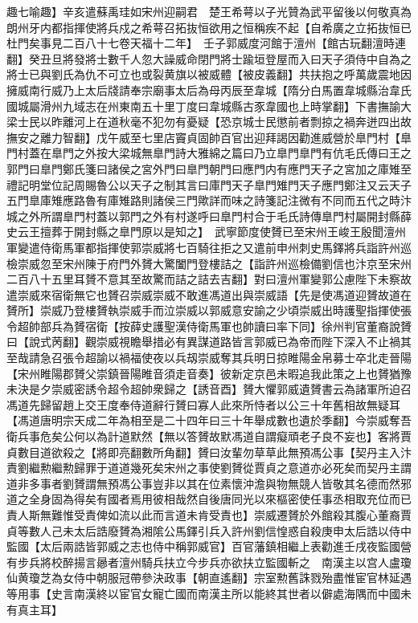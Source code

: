 趣七喻趣】辛亥遣蘇禹珪如宋州迎嗣君　楚王希萼以子光贊為武平留後以何敬真為朗州牙内都指揮使將兵戍之希萼召拓抜恒欲用之恒稱疾不起【自希廣之立拓抜恒已杜門矣事見二百八十七卷天福十二年】　壬子郭威度河館于澶州【館古玩翻澶時連翻】癸丑旦將發將士數千人忽大譟威命閉門將士踰垣登屋而入曰天子須侍中自為之將士已與劉氏為仇不可立也或裂黄旗以被威體【被皮義翻】共扶抱之呼萬歲震地因擁威南行威乃上太后牋請奉宗廟事太后為母丙辰至韋城【隋分白馬置韋城縣治韋氏國城屬滑州九域志在州東南五十里丁度曰韋城縣古豕韋國也上時掌翻】下書撫諭大梁士民以昨離河上在道秋毫不犯勿有憂疑【恐京城士民懲前者剽掠之禍奔迸四出故撫安之離力智翻】戊午威至七里店竇貞固帥百官出迎拜謁因勸進威營於臯門村【臯門村蓋在臯門之外按大梁城無臯門詩大雅綿之篇曰乃立臯門臯門有伉毛氏傳曰王之郭門曰臯門鄭氏箋曰諸侯之宮外門曰臯門朝門曰應門内有應門天子之宮加之庫雉至禮記明堂位記周賜魯公以天子之制其言曰庫門天子臯門雉門天子應門鄭注又云天子五門臯庫雉應路魯有庫雉路則諸侯三門歟詳而味之詩箋記注微有不同而五代之時汴城之外所謂臯門村蓋以郭門之外有村遂呼曰臯門村合于毛氏詩傳臯門村屬開封縣薛史云王擅葬于開封縣之臯門原以是知之】　武寧節度使贇已至宋州王峻王殷聞澶州軍變遣侍衛馬軍都指揮使郭崇威將七百騎往拒之又遣前申州刺史馬鐸將兵詣許州巡檢崇威忽至宋州陳于府門外贇大驚闔門登樓詰之【詣許州巡檢備劉信也汴京至宋州二百八十五里耳贇不意其至故驚而詰之詰去吉翻】對曰澶州軍變郭公慮陛下未察故遣崇威來宿衛無它也贇召崇威崇威不敢進馮道出與崇威語【先是使馮道迎贇故道在贇所】崇威乃登樓贇執崇威手而泣崇威以郭威意安諭之少頃崇威出時護聖指揮使張令超帥部兵為贇宿衛【按薛史護聖漢侍衛馬軍也帥讀曰率下同】徐州判官董裔說贇曰【說式苪翻】觀崇威視瞻舉措必有異謀道路皆言郭威已為帝而陛下深入不止禍其至哉請急召張令超諭以禍福使夜以兵刼崇威奪其兵明日掠睢陽金帛募士卒北走晉陽【宋州睢陽郡贇父崇鎮晉陽睢音須走音奏】彼新定京邑未暇追我此策之上也贇猶豫未決是夕崇威密誘令超令超帥衆歸之【誘音酉】贇大懼郭威遺贇書云為諸軍所迫召馮道先歸留趙上交王度奉侍道辭行贇曰寡人此來所恃者以公三十年舊相故無疑耳【馮道唐明宗天成二年為相至是二十四年曰三十年舉成數也遺於季翻】今崇威奪吾衛兵事危矣公何以為計道默然【無以答贇故默馮道自謂癡頑老子良不妄也】客將賈貞數目道欲殺之【將即亮翻數所角翻】贇曰汝輩勿草草此無預馮公事【契丹主入汴責劉繼勲繼勲歸罪于道道幾死矣宋州之事使劉贇從賈貞之意道亦必死矣而契丹主謂道非多事者劉贇謂無預馮公事豈非以其在位素懷沖澹與物無競人皆敬其名德而然邪道之全身固為得矣有國者焉用彼相哉然自後唐同光以來樞密使任事丞相取充位而已責人斯無難惟受責俾如流以此而言道未肯受責也】崇威遷贇於外館殺其腹心董裔賈貞等數人己未太后誥廢贇為湘隂公馬鐸引兵入許州劉信惶惑自殺庚申太后誥以侍中監國【太后兩誥皆郭威之志也侍中稱郭威官】百官藩鎮相繼上表勸進壬戌夜監國營有步兵將校醉揚言曏者澶州騎兵扶立今步兵亦欲扶立監國斬之　南漢主以宫人盧瓊仙黄瓊芝為女侍中朝服冠帶參決政事【朝直遙翻】宗室勲舊誅戮殆盡惟宦官林延遇等用事【史言南漢終以宦官女寵亡國而南漢主所以能終其世者以僻處海隅而中國未有真主耳】

